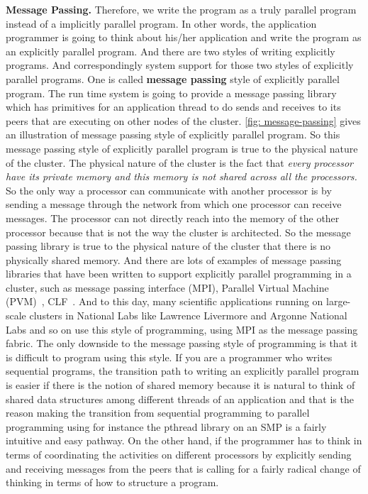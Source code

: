 \documentclass[11pt]{lecture}
\begin{document}
\noindent
{\bf Message Passing.} Therefore, we write the program as a truly parallel program instead of a implicitly parallel 
program. In other words, the application programmer is going to think about his/her application and write the 
program as an explicitly parallel program. And there are two styles of writing explicitly programs. And correspondingly 
system support for those two styles of explicitly parallel programs. One is called {\bf message passing} style of explicitly 
parallel program. The run time system is going to provide a message passing library which has primitives for 
an application thread to do sends and receives to its peers that are executing on other nodes of the cluster. 
\autoref{fig: message-passing} gives an illustration of message passing style of explicitly parallel program. 
So this message passing style of explicitly parallel program is true to the physical nature of the cluster. 
The physical nature of the cluster is the fact that {\it every processor have its private memory 
and this memory is not shared across all the processors.} So the only way a processor can communicate with 
another processor is by sending a message through the network from which one processor can receive messages.  
The processor can not directly reach into the memory of the other processor because that is not the way the cluster 
is architected. So the message passing library is true to the physical nature of the cluster that 
there is no physically shared memory. And there are lots of examples of message passing libraries that have been 
written to support explicitly parallel programming in a cluster, such as message passing interface (MPI), 
Parallel Virtual Machine (PVM)~\cite{pvm}, CLF~\cite{watkins2003clf}. And to this day, many scientific applications running on large-scale clusters in National Labs like 
Lawrence Livermore and Argonne National Labs and so on use this style of programming, using MPI as the 
message passing fabric. The only downside to the message passing style of programming is that it is difficult to 
program using this style. If you are a programmer who writes sequential programs, the transition path to writing an explicitly 
parallel program is easier if there is the notion of shared memory because it is natural to think of 
shared data structures among different threads of an application and that is the reason making the transition from 
sequential programming to parallel programming using for instance the {\code pthread} library on an SMP is 
a fairly intuitive and easy pathway. On the other hand, if the programmer has to think in terms of 
coordinating the activities on different processors by explicitly sending and receiving messages from 
the peers that is calling for a fairly radical change of thinking in terms of how to structure a 
program. 
\end{document}
